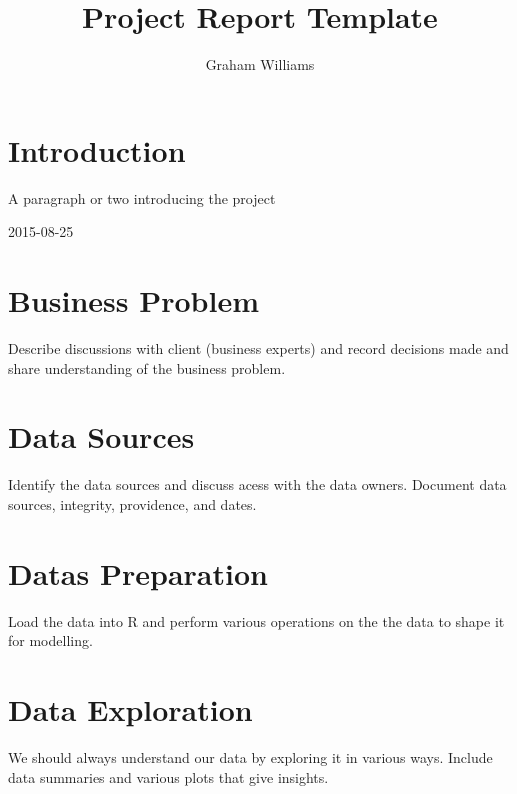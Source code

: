 \documentclass[a4paper]{article}\usepackage[]{graphicx}\usepackage[]{color}
\begin{document}
\title{Project Report Template}
\author{Graham Williams}
\maketitle\thispagestyle{empty}

\section{Introduction}

A paragraph or two introducing the project

2015-08-25

\section{Business Problem}

Describe discussions with client (business experts) and record decisions made and share understanding of the business problem.

\section{Data Sources}

Identify the data sources and discuss acess with the data owners. Document data sources, integrity, providence, and dates.

\section{Datas Preparation}

Load the data into R and perform various operations on the the data to shape it for modelling.

\section{Data Exploration}

We should always understand our data by exploring it in various ways. Include data summaries and various plots that give insights.
\end{document}
